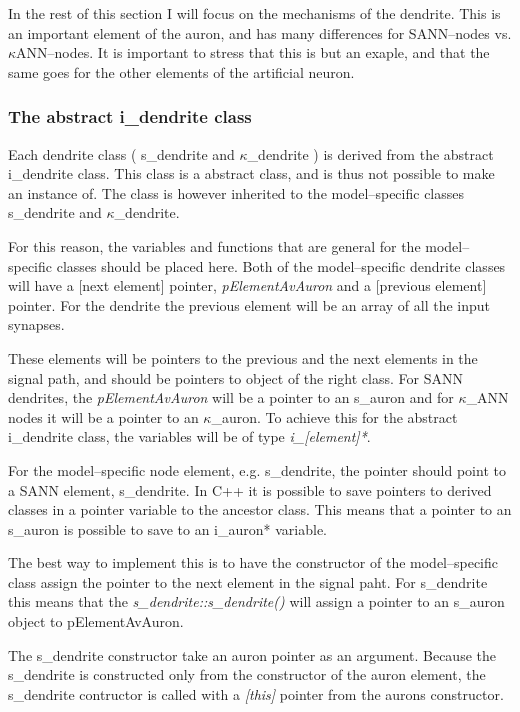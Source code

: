 	In the rest of this section I will focus on the mechanisms of the dendrite. This is an important element of the auron, and has many differences for SANN--nodes vs. $\kappa$ANN--nodes. 
	It is important to stress that this is but an exaple, and that the %
		same goes for the other elements of the artificial neuron.

	\subsubsection{The abstract i\_dendrite class}
	Each dendrite class ( s\_dendrite and $\kappa$\_dendrite ) is derived from the abstract i\_dendrite class.
	This class is a abstract class, and is thus not possible to make an instance of. The class is however inherited to the model--specific classes s\_dendrite and $\kappa$\_dendrite.

	For this reason, the variables and functions that are general for the model--specific classes should be placed here. 
	Both of the model--specific dendrite classes will have a [next element] pointer, \emph{pElementAvAuron} and a [previous element] pointer. For the dendrite the previous element will be an array of all the input synapses.

	These elements will be pointers to the previous and the next elements in the signal path, and should be pointers to object of the right class. 
	For SANN dendrites, the \emph{pElementAvAuron} will be a pointer to an s\_auron and for $\kappa$\_ANN nodes it will be a pointer to an $\kappa$\_auron. 
	To achieve this for the abstract i\_dendrite class, the variables will be of type \emph{i\_[element]*}. %

	For the model--specific node element, e.g. s\_dendrite, the pointer should point to a SANN element, s\_dendrite. In C++ it is possible to save pointers to derived classes in a pointer variable to the ancestor class.
	This means that a pointer to an s\_auron is possible to save to an i\_auron* variable.

	The best way to implement this is to have the constructor of the model--specific class assign the pointer to the next element in the signal paht. 
	For s\_dendrite this means that the \emph{s\_dendrite::s\_dendrite()} will assign a pointer to an s\_auron object to pElementAvAuron.

	The s\_dendrite constructor take an auron pointer as an argument. 
	Because the s\_dendrite is constructed only from the constructor of the auron element, the s\_dendrite contructor is called with a \emph{[this]} pointer from the aurons constructor.

